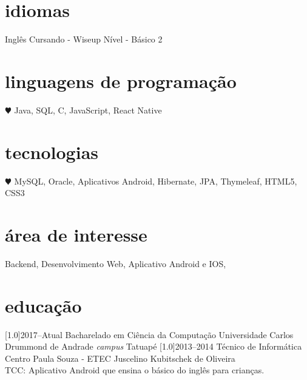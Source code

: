 \documentclass[espanol]{cv-style}     %
\begin{document}
\begin{aside}
\section{idiomas}
Inglês
Cursando - Wiseup
Nível - Básico 2

%
\section{linguagens de programação}
{\color{red} $\varheartsuit$} Java, SQL, C, JavaScript, React Native
%
\section{tecnologias}
{\color{red} $\varheartsuit$} MySQL, Oracle, Aplicativos Android, Hibernate, JPA, Thymeleaf, HTML5, CSS3
%
\end{aside}
\vspace{0.2cm}
\section{área de interesse}
  \vspace{-0.2cm}
Backend, Desenvolvimento Web, Aplicativo Android e IOS,
\section{educação}
  \vspace{-0.2cm}
\begin{entrylist}
\entry
{\scalebox{.8}[1.0]{2017--Atual}}
{Bacharelado em Ciência da Computação}
{}
{Universidade Carlos Drummond de Andrade \textit{campus} Tatuapé}
\entry
{\scalebox{.8}[1.0]{2013--2014}}
{Técnico de Informática}
{}
{Centro Paula Souza - ETEC Juscelino Kubitschek de Oliveira
\\TCC: Aplicativo Android que ensina o básico do inglês para crianças.}
\end{entrylist}
\end{document}
